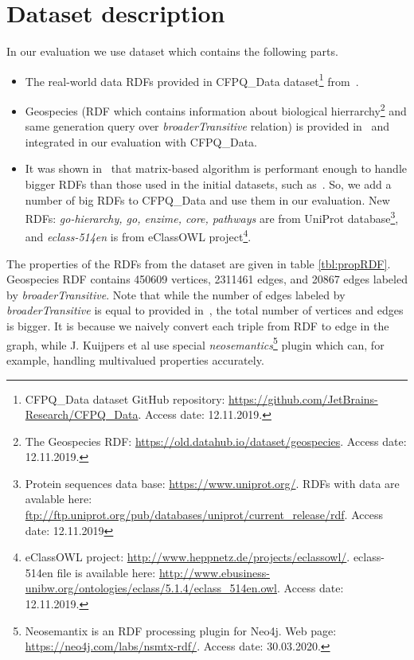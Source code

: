 \section{Dataset description}\label{section:dataset}

In our evaluation we use dataset which contains the following parts.
\begin{itemize}
\item The real-world data RDFs provided in CFPQ\_Data dataset\footnote{CFPQ\_Data dataset GitHub repository: \url{https://github.com/JetBrains-Research/CFPQ_Data}. Access date: 12.11.2019.} from~\cite{Mishin:2019:ECP:3327964.3328503}.
\item Geospecies (RDF which contains information about biological hierrarchy\footnote{The Geospecies RDF: \url{https://old.datahub.io/dataset/geospecies}. Access date: 12.11.2019.} and same generation query over \textit{broaderTransitive} relation) is provided in~\cite{Kuijpers:2019:ESC:3335783.3335791} and integrated in our evaluation with CFPQ\_Data.
\item It was shown in~\cite{Mishin:2019:ECP:3327964.3328503} that matrix-based algorithm is performant enough to handle bigger RDFs than those used in the initial datasets, such as~\cite{RDF}.
So, we add a number of big RDFs to CFPQ\_Data and use them in our evaluation.
New RDFs: \textit{go-hierarchy, go, enzime, core, pathways} are from UniProt database\footnote{Protein sequences data base: \url{https://www.uniprot.org/}. RDFs with data are avalable here: \url{ftp://ftp.uniprot.org/pub/databases/uniprot/current_release/rdf}. Access date: 12.11.2019}, and \textit{eclass-514en} is from eClassOWL project\footnote{eClassOWL project: \url{http://www.heppnetz.de/projects/eclassowl/}. eclass-514en file is available here: \url{http://www.ebusiness-unibw.org/ontologies/eclass/5.1.4/eclass_514en.owl}. Access date: 12.11.2019.}.
\end{itemize}

The properties of the RDFs from the dataset are given in table \ref{tbl:propRDF}. 
Geospecies RDF contains 450609 vertices, 2311461 edges, and 20867 edges labeled by \textit{broaderTransitive}.
Note that while the number of edges labeled by \textit{broaderTransitive} is equal to provided in~\cite{Kuijpers:2019:ESC:3335783.3335791}, the total number of vertices and edges is bigger. It is because we naively convert each triple from RDF to edge in the graph, while J. Kuijpers et al use special \textit{neosemantics}\footnote{Neosemantix is an RDF processing plugin for Neo4j. Web page: \url{https://neo4j.com/labs/nsmtx-rdf/}. Access date: 30.03.2020.} plugin which can, for example, handling multivalued properties accurately.  

